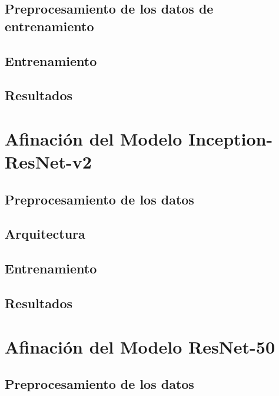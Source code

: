\subsection{Preprocesamiento de los datos de entrenamiento}


\subsection{Entrenamiento}

\subsection{Resultados}



\cite{Inception-v3}




\section{Afinación del Modelo Inception-ResNet-v2}

\cite{Inception-ResNet}

\subsection{Preprocesamiento de los datos}

\subsection{Arquitectura}

\subsection{Entrenamiento}

\subsection{Resultados}








\section{Afinación del Modelo ResNet-50}
\cite{ResNet}

\subsection{Preprocesamiento de los datos}

